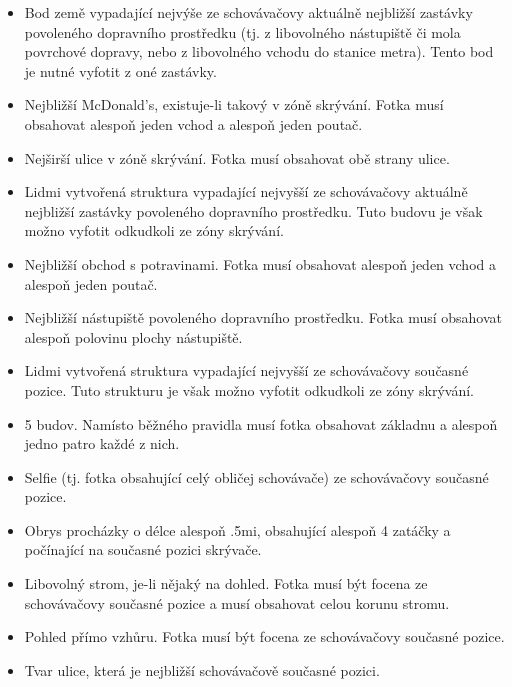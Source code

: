 \begin{itemize}
	\item Bod země vypadající nejvýše ze schovávačovy aktuálně nejbližší zastávky povoleného dopravního prostředku (tj. z libovolného nástupiště či mola povrchové dopravy, nebo z libovolného vchodu do stanice metra). Tento bod je nutné vyfotit z oné zastávky.
	\item Nejbližší McDonald's, existuje-li takový v zóně skrývání. Fotka musí obsahovat alespoň jeden vchod a alespoň jeden poutač.
	\item Nejširší ulice v zóně skrývání. Fotka musí obsahovat obě strany ulice.
	\item Lidmi vytvořená struktura vypadající nejvyšší ze schovávačovy aktuálně nejbližší zastávky povoleného dopravního prostředku. Tuto budovu je však možno vyfotit odkudkoli ze zóny skrývání.
	\item Nejbližší obchod s potravinami. Fotka musí obsahovat alespoň jeden vchod a alespoň jeden poutač.
	\item Nejbližší nástupiště povoleného dopravního prostředku. Fotka musí obsahovat alespoň polovinu plochy nástupiště.
	\item Lidmi vytvořená struktura vypadající nejvyšší ze schovávačovy současné pozice. Tuto strukturu je však možno vyfotit odkudkoli ze zóny skrývání.
	\item 5 budov. Namísto běžného pravidla musí fotka obsahovat základnu a alespoň jedno patro každé z nich.
	\item Selfie (tj. fotka obsahující celý obličej schovávače) ze schovávačovy současné pozice.
	\item Obrys procházky o délce alespoň \dist.5mi, obsahující alespoň 4 zatáčky a počínající na současné pozici skrývače.
	\item Libovolný strom, je-li nějaký na dohled. Fotka musí být focena ze schovávačovy současné pozice a musí obsahovat celou korunu stromu.
	\item Pohled přímo vzhůru. Fotka musí být focena ze schovávačovy současné pozice.
	\item Tvar ulice, která je nejbližší schovávačově současné pozici.
\end{itemize}

